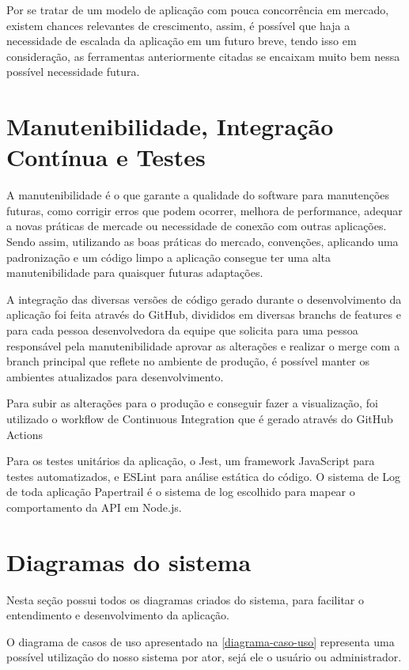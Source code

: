 Por se tratar de um modelo de aplicação com pouca concorrência em mercado, existem chances relevantes de crescimento, assim, é possível que haja a necessidade de escalada da aplicação em um futuro breve, tendo isso em consideração, as ferramentas anteriormente citadas se encaixam muito bem nessa possível necessidade futura. 



\section{Manutenibilidade, Integração Contínua e Testes}
A manutenibilidade é o que garante a qualidade do software para manutenções futuras, como corrigir erros que podem ocorrer, melhora de performance, adequar a novas práticas de mercade ou necessidade de conexão com outras aplicações. Sendo assim, utilizando as boas práticas do mercado, convenções, aplicando uma padronização e um código limpo a aplicação consegue ter uma alta manutenibilidade para quaisquer futuras adaptações.  

A integração das diversas versões de código gerado durante o desenvolvimento da aplicação foi feita através do GitHub, divididos em diversas branchs de features e para cada pessoa desenvolvedora da equipe que solicita para uma pessoa responsável pela manutenibilidade aprovar as alterações e realizar o merge com a branch principal que reflete no ambiente de produção, é possível manter os ambientes atualizados para desenvolvimento.

Para subir as alterações para o produção e conseguir fazer a visualização, foi utilizado o workflow de Continuous Integration que é gerado através do GitHub Actions

Para os testes unitários da aplicação, o Jest, um framework JavaScript para testes automatizados, e ESLint para análise estática do código.
O sistema de Log de toda aplicação Papertrail é o sistema de log escolhido para mapear o comportamento da API em Node.js.

\section{Diagramas do sistema}

Nesta seção possui todos os diagramas criados do sistema, para facilitar o entendimento e desenvolvimento da aplicação. 

O diagrama de casos de uso apresentado na \autoref{diagrama-caso-uso} representa uma possível utilização do nosso sistema por ator, sejá ele o usuário ou administrador.

